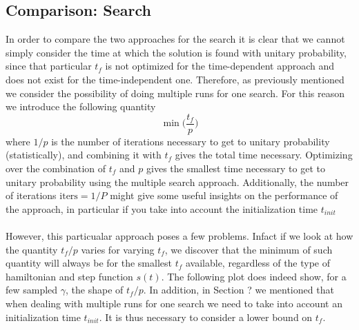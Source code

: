     \subsection{Comparison: Search}
        In order to compare the two approaches for the search it is clear that we cannot simply consider the time at which the solution is found with unitary probability, since that particular $t_f$ is not optimized for the time-dependent approach and does not exist for the time-independent one. Therefore, as previously mentioned we consider the possibility of doing multiple runs for one search. For this reason we introduce the following quantity
        \begin{equation}
          \min\Big(\frac{t_f}{p}\Big)
        \end{equation}
        where $1/p$ is the number of iterations necessary to get to unitary probability (statistically), and combining it with $t_f$ gives the total time necessary. Optimizing over the combination of $t_f$ and $p$ gives the smallest time necessary to get to unitary probability using the multiple search approach. Additionally, the number of iterations $\mbox{iters}=1/P$ might give some useful insights on the performance of the approach, in particular if you take into account the initialization time $t_{init}$\\ \\  However, this particualar approach poses a few problems. Infact if we look at how the quantity $t_f/p$ varies for varying $t_f$, we discover that the minimum of such quantity will always be for the smallest $t_f$ available, regardless of the type of hamiltonian and step function $s(t)$. The following plot does indeed show, for a few sampled $\gamma$, the shape of $t_f/p$. In addition, in Section ? we mentioned that when dealing with multiple runs for one search we need to take into account an initialization time $t_{init}$. It is thus necessary to consider a lower bound on $t_f$.
